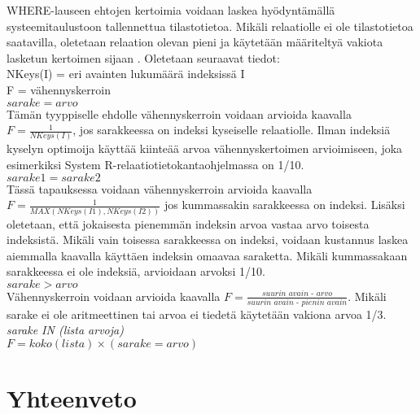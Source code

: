 \documentclass[finnish]{tktltiki2}
\theoremstyle{definition}
\theoremstyle{remark}
\begin{document}
WHERE-lauseen ehtojen kertoimia voidaan laskea hyödyntämällä systeemitaulustoon tallennettua tilastotietoa. Mikäli relaatiolle ei ole tilastotietoa saatavilla, oletetaan relaation olevan pieni ja käytetään määriteltyä vakiota lasketun kertoimen sijaan \cite{selinger1979access}. Oletetaan seuraavat tiedot: %
\\\newline
NKeys(I) = eri avainten lukumäärä indeksissä I
\\
F = vähennyskerroin
\\\newline
$sarake = arvo$ 
\\
Tämän tyyppiselle ehdolle vähennyskerroin voidaan arvioida kaavalla $F = \frac{1}{NKeys(I)}$, jos sarakkeessa on indeksi kyseiselle relaatiolle. \cite{selinger1979access} Ilman indeksiä kyselyn optimoija käyttää kiinteää arvoa vähennyskertoimen arvioimiseen, joka esimerkiksi System R-relaatiotietokantaohjelmassa on 1/10.
\\\newline
$sarake1 = sarake2$ 
\\
Tässä tapauksessa voidaan vähennyskerroin arvioida kaavalla $F = \frac{1}{MAX (NKeys(I1), NKeys(I2))}$ jos kummassakin sarakkeessa on indeksi. Lisäksi oletetaan, että jokaisesta pienemmän indeksin arvoa vastaa arvo toisesta indeksistä. Mikäli vain toisessa sarakkeessa on indeksi, 
voidaan kustannus laskea aiemmalla kaavalla käyttäen indeksin omaavaa saraketta. Mikäli kummassakaan sarakkeessa ei ole indeksiä, arvioidaan arvoksi 1/10.
\\\newline
$sarake > arvo$
\\
Vähennyskerroin voidaan arvioida kaavalla $F = \frac{\textit{suurin avain - arvo}}{\textit{suurin avain - pienin avain}}$. Mikäli sarake ei ole aritmeettinen tai arvoa ei tiedetä käytetään vakiona arvoa 1/3.
\\\newline
\textit{sarake IN (lista arvoja)}
\\
$F = koko(lista) \times (sarake = arvo)$




\section{Yhteenveto}

\newpage



%


\end{document}
